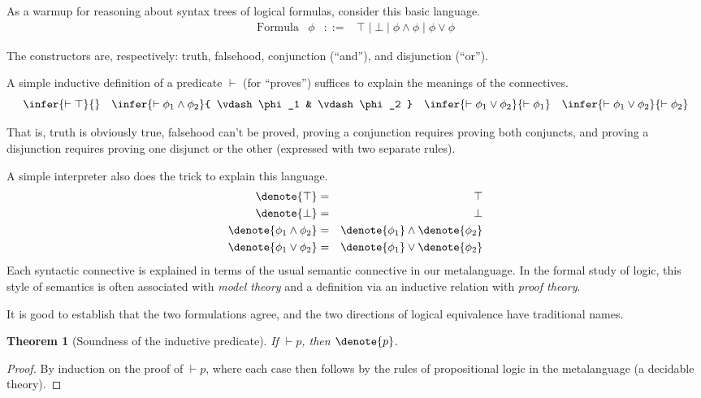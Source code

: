 \documentclass{amsbook}
\newtheorem{theorem}{Theorem}[chapter]
\theoremstyle{definition}
\theoremstyle{remark}
\numberwithin{section}{chapter}
\numberwithin{equation}{chapter}
\begin{document}
As a warmup for reasoning about syntax trees of logical formulas, consider this basic language. 
$$\begin{array}{rrcl}
  \textrm{Formula} & \phi &::=& \top \mid \bot \mid \phi \land \phi \mid \phi \lor \phi
\end{array}$$

The constructors are, respectively: truth, falsehood, conjunction (``and''), and disjunction (``or'').

A simple inductive definition of a predicate $\vdash$ (for ``proves'') suffices to explain the meanings of the connectives.
$$\infer{\vdash \top}{}
\quad \infer{\vdash \phi_1 \land \phi_2}{
  \vdash \phi_1
  & \vdash \phi_2
}
\quad \infer{\vdash \phi_1 \lor \phi_2}{
  \vdash \phi_1
}
\quad \infer{\vdash \phi_1 \lor \phi_2}{
  \vdash \phi_2
}$$

That is, truth is obviously true, falsehood can't be proved, proving a conjunction requires proving both conjuncts, and proving a disjunction requires proving one disjunct or the other (expressed with two separate rules).

A simple interpreter also does the trick to explain this language.
\begin{eqnarray*}
  \denote{\top} &=& \top \\
  \denote{\bot} &=& \bot \\
  \denote{\phi_1 \land \phi_2} &=& \denote{\phi_1} \land \denote{\phi_2} \\
  \denote{\phi_1 \lor \phi_2} &=& \denote{\phi_1} \lor \denote{\phi_2}
\end{eqnarray*}
Each syntactic connective is explained in terms of the usual semantic connective in our metalanguage.
In the formal study of logic, this style of semantics is often associated with \emph{model theory} and a definition via an inductive relation with \emph{proof theory}.

It is good to establish that the two formulations agree, and the two directions of logical equivalence have traditional names.

\begin{theorem}[Soundness of the inductive predicate]
  If $\vdash p$, then $\denote{p}$.
\end{theorem}
\begin{proof}
  By induction on the proof of $\vdash p$, where each case then follows by the rules of propositional logic in the metalanguage (a decidable theory).
\end{proof}
\end{document}
